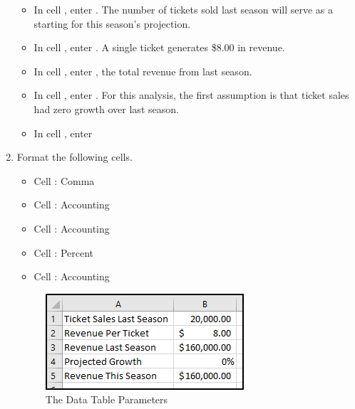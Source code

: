 \begin{enumbox}
\begin{enumerate}
		\begin{itemize}
			\item In cell , enter . The number of tickets sold last season will serve as a starting for this season's projection.
			\item In cell , enter . A single ticket generates \$$ 8.00 $ in revenue.
			\item In cell , enter , the total revenue from last season. 
			\item In cell , enter . For this analysis, the first assumption is that ticket sales had zero growth over last season.
			\item In cell , enter 
		\end{itemize}
	
		\item Format the following cells.
	
		\begin{itemize}
			\item Cell : Comma
			\item Cell : Accounting
			\item Cell : Accounting
			\item Cell : Percent
			\item Cell : Accounting
		\end{itemize}
	

		\begin{figure}[H]
			\centering
			\includegraphics[width=\maxwidth{.65\linewidth}]{gfx/ch08_fig40}
			\caption{The Data Table Parameters}
			\label{08:fig40}
		\end{figure}


\end{enumerate}
\end{enumbox}
